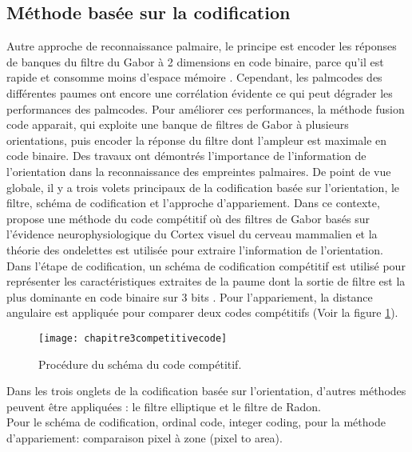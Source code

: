 \subsection{Méthode basée sur la codification}
\label{codificationchp2}
Autre approche de reconnaissance palmaire, le principe est encoder les réponses de banques du filtre du Gabor à 2 dimensions en code binaire, parce qu’il est rapide et consomme moins d’espace mémoire \citep{yue2010survey}. Cependant, les palmcodes des différentes paumes ont encore une corrélation évidente ce qui peut dégrader les performances des palmcodes. Pour améliorer ces performances, la méthode fusion code apparait, qui exploite une banque de filtres de Gabor à plusieurs orientations, puis encoder la réponse du filtre dont l’ampleur est maximale en code binaire.
Des travaux ont démontrés l’importance de l’information de l’orientation dans la reconnaissance des empreintes palmaires. De point de vue globale, il y a trois volets principaux de la codification basée sur l’orientation, le filtre, schéma de codification et l’approche d’appariement. Dans ce contexte, \citep{kong2004competitive} propose une méthode du code compétitif où des filtres de Gabor basés sur l’évidence neurophysiologique du Cortex visuel du cerveau mammalien et la théorie des ondelettes est utilisée pour extraire l’information de l’orientation. Dans l’étape de codification, un schéma de codification compétitif est utilisé pour représenter les caractéristiques extraites de la paume dont la sortie de filtre est la plus dominante en code binaire sur 3 bits \citep{kong2004competitive}. Pour l’appariement, la distance angulaire est appliquée pour comparer deux codes compétitifs (Voir la figure \ref{fig:chapitre3competitivecode}).
\begin{center}
	\begin{figure}[H]
		\centering
		\texttt{[image: chapitre3competitivecode]}
		\caption{Procédure du schéma du code compétitif.}
		\label{fig:chapitre3competitivecode}
	\end{figure}
\end{center}
Dans les trois onglets de la codification basée sur l’orientation, d’autres méthodes peuvent être appliquées : le filtre elliptique et le filtre de Radon.
\\ 
Pour le schéma de codification, ordinal code, integer coding, pour la méthode d’appariement: comparaison pixel à zone (pixel to area)\citep{zhang2012comparative}.
